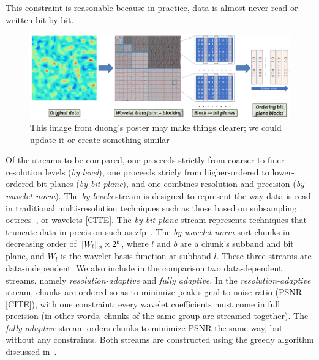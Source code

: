   This constraint is reasonable
because in practice, data is almost never read or written bit-by-bit.

\begin{figure}
        \centering
        \includegraphics[width=\linewidth]{img/pipeline.png}
        \caption{{This image from duong's poster may make things clearer; we could update it or create something similar}}
\end{figure}

  Of the streams to be
compared, one proceeds strictly from coarser to finer resolution
levels (\emph{by level}), one proceeds stricly from higher-ordered to
lower-ordered bit planes (\emph{by bit plane}), and one combines
resolution and precision (\emph{by wavelet norm}). The \emph{by
  levels} stream is designed to represent the way data is read in
traditional multi-resolution techniques such as those based on
subsampling~\cite{idx2001}, octrees~\cite{multires_octree1999}, or
wavelets [CITE]. The \emph{by bit plane} stream represents techniques
that truncate data in precision such as zfp~\cite{zfp2014}.  The
\emph{by wavelet norm} sort chunks in decreasing order of
$\left\lVert W_l\right\rVert_2 \times 2^b$, where $l$ and $b$ are a chunk's subband and
bit plane, and $W_l$ is the wavelet basis function at subband $l$.
These three streams are data-independent. We also include in the
comparison two data-dependent streams, namely
\emph{resolution-adaptive} and \emph{fully adaptive}. In the
\emph{resolution-adaptive} stream, chunks are ordered so as to
minimize peak-signal-to-noise ratio (PSNR [CITE]), with one
constraint: every wavelet coefficients must come in full precision (in
other words, chunks of the same group are streamed together). The
\emph{fully adaptive} stream orders chunks to minimize PSNR the same
way, but without any constraints. Both streams are constructed using
the greedy algorithm discussed in~.

